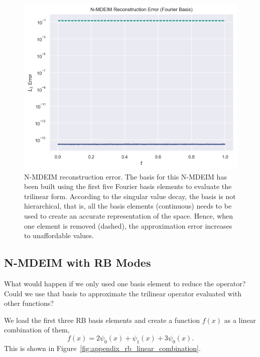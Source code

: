\documentclass[../../thesis.tex]{subfiles}
\begin{document}
\begin{figure}[h]
    \includegraphics[width=\columnwidth]{research_project/piston/figures/svd_fourier/fourier_basis_mdeim_truncation_errors_comparison.png}
    \caption{N-MDEIM reconstruction error.
    The basis for this N-MDEIM has been built using 
    the first five Fourier basis elements to evaluate the trilinear form.
    According to the singular value decay, the basis is not hierarchical, 
    that is, all the basis elements (continuous) needs to be used to 
    create an accurate representation of the space.
    Hence, when one element is removed (dashed), 
    the approximation error increases to unaffordable values.}
    \label{fig:appendix_fourier_nmdeim_reconstruction_error}
\end{figure}

\subsection{N-MDEIM with RB Modes}
\label{sec:nmdeim_one_mode}
What would happen if we only used one basis element to reduce the operator?
Could we use that basis to approximate the trilinear operator evaluated with other functions?

We load the first three RB basis elements and create a function $f(x)$ as a linear combination of them,
\begin{equation}
    f(x) = 2 \psi_0(x) + \psi_1(x) + 3 \psi_0(x).
\end{equation} 
This is shown in Figure~\ref{fig:appendix_rb_linear_combination}.
\end{document}
